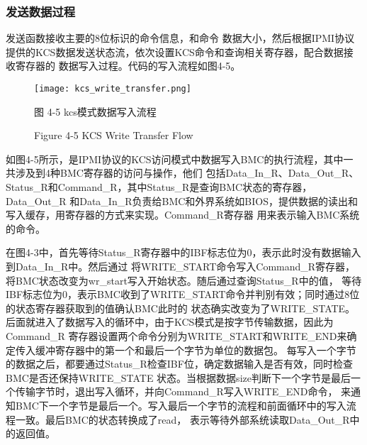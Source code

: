 \subsubsection{发送数据过程}
发送函数接收主要的8位标识的命令信息，和命令
数据大小，然后根据IPMI协议提供的KCS数据发送状态流，依次设置KCS命令和查询相关寄存器，配合数据接收寄存器的
数据写入过程\cite{english22}。代码的写入流程如图4-5。

\begin{figure}[htb]
    \vspace{0cm}   
    \setlength{\abovecaptionskip}{0.3cm}
	\centering
    \texttt{[image: kcs\_write\_transfer.png]}
    \caption*{图 4-5 kcs模式数据写入流程}
    \setlength{\belowcaptionskip}{-0.7cm}
    \caption*{Figure 4-5 KCS Write Transfer Flow}
\end{figure}

如图4-5所示，是IPMI协议的KCS访问模式中数据写入BMC的执行流程，其中一共涉及到4种BMC寄存器的访问与操作，他们
包括Data\_In\_R、Data\_Out\_R、Status\_R和Command\_R，其中Status\_R是查询BMC状态的寄存器，Data\_Out\_R
和Data\_In\_R负责给BMC和外界系统如BIOS，提供数据的读出和写入缓存，用寄存器的方式来实现。Command\_R寄存器
用来表示输入BMC系统的命令。
\par 在图4-3中，首先等待Status\_R寄存器中的IBF标志位为0，表示此时没有数据输入到Data\_In\_R中。然后通过
将WRITE\_START命令写入Command\_R寄存器，将BMC状态改变为wr\_start写入开始状态。随后通过查询Status\_R中的值，
等待IBF标志位为0，表示BMC收到了WRITE\_START命令并判别有效；同时通过8位的状态寄存器获取到的值确认BMC此时的
状态确实改变为了WRITE\_STATE。后面就进入了数据写入的循环中，由于KCS模式是按字节传输数据，因此为Command\_R
寄存器设置两个命令分别为WRITE\_START和WRITE\_END来确定传入缓冲寄存器中的第一个和最后一个字节为单位的数据包。
每写入一个字节的数据之后，都要通过Status\_R检查IBF位，确定数据输入是否有效，同时检查BMC是否还保持WRITE\_STATE
状态。当根据数据size判断下一个字节是最后一个传输字节时，退出写入循环，并向Command\_R写入WRITE\_END命令，
来通知BMC下一个字节是最后一个。写入最后一个字节的流程和前面循环中的写入流程一致。最后BMC的状态转换成了read，
表示等待外部系统读取Data\_Out\_R中的返回值。

